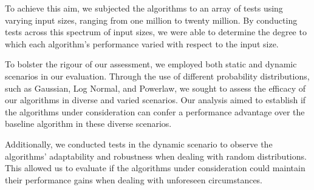 \documentclass[11pt,a4paper]{article}
\begin{document}
To achieve this aim, we subjected the algorithms to an array of tests using varying input sizes, ranging from one million to twenty million. By conducting tests across this spectrum of input sizes, we were able to determine the degree to which each algorithm's performance varied with respect to the input size.

To bolster the rigour of our assessment, we employed both static and dynamic scenarios in our evaluation. Through the use of different probability distributions, such as Gaussian, Log Normal, and Powerlaw, we sought to assess the efficacy of our algorithms in diverse and varied scenarios. Our analysis aimed to establish if the algorithms under consideration can confer a performance advantage over the baseline algorithm in these diverse scenarios.

Additionally, we conducted tests in the dynamic scenario to observe the algorithms' adaptability and robustness when dealing with random distributions. This allowed us to evaluate if the algorithms under consideration could maintain their performance gains when dealing with unforeseen circumstances.
\end{document}
